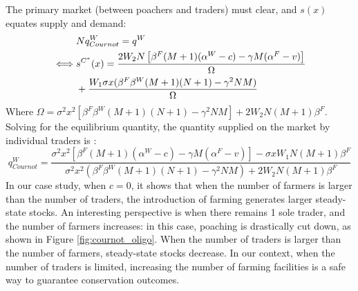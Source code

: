 %
The primary market (between poachers and traders) must clear, and $s(x)$ equates supply and demand: 
\begin{align}
    &Nq^W_{Cournot} = q^W \\
    \iff & s^{C^*}(x) = \frac{2W_2N\left[\beta^F (M+1) (\alpha^W-c) - \gamma M (\alpha^F - v)\right]}{\Omega}\\
     &+\frac{W_1 \sigma x (\beta^F \beta^W (M+1)(N+1) - \gamma^2 NM)}{\Omega} \notag
\end{align}
Where $\Omega = \sigma^2 x^2 [\beta^F \beta^W (M+1) (N+1) - \gamma^2 NM] + 2W_2N(M+1)\beta^F$.
%
Solving for the equilibrium quantity, the quantity supplied on the market by individual traders is : 
%
\begin{equation}
    q^W_{Cournot} = \frac{\sigma^2 x^2 \left[ \beta^F(M+1) (\alpha^W - c) - \gamma M(\alpha^F -v) \right] - \sigma x W_1 N(M+1) \beta^F}{\sigma^2 x^2 (\beta^F \beta^W (M+1)(N+1)-\gamma^2 NM) + 2W_2N(M+1)\beta^F}
\end{equation}
In our case study, when $c=0$, it 
shows that when the number of farmers is larger than the number of traders, the introduction of farming generates larger steady-state stocks. An interesting perspective is when there remains 1 sole trader, and the number of farmers increases: in this case, poaching is drastically cut down, as shown in Figure \ref{fig:cournot_oligo}.
%
When the number of traders is larger than the number of farmers, steady-state stocks decrease. In our context, when the number of traders is limited, increasing the number of farming facilities is a safe way to guarantee conservation outcomes. 

